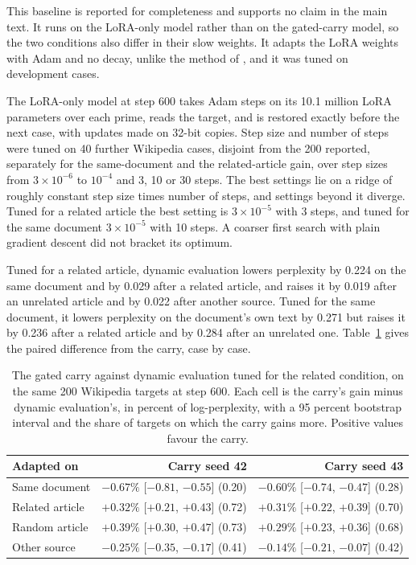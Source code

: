 \documentclass[12pt,a4paper]{report}
\begin{document}
This baseline is reported for completeness and supports no claim in the main text. It runs on the LoRA-only model rather than on the gated-carry model, so the two conditions also differ in their slow weights. It adapts the LoRA weights with Adam and no decay, unlike the method of \citet{krause2018dynamic}, and it was tuned on development cases.

The LoRA-only model at step 600 takes Adam steps on its 10.1 million LoRA parameters over each prime, reads the target, and is restored exactly before the next case, with updates made on 32-bit copies. Step size and number of steps were tuned on 40 further Wikipedia cases, disjoint from the 200 reported, separately for the same-document and the related-article gain, over step sizes from $3 \times 10^{-6}$ to $10^{-4}$ and 3, 10 or 30 steps. The best settings lie on a ridge of roughly constant step size times number of steps, and settings beyond it diverge. Tuned for a related article the best setting is $3 \times 10^{-5}$ with 3 steps, and tuned for the same document $3 \times 10^{-5}$ with 10 steps. A coarser first search with plain gradient descent did not bracket its optimum.

Tuned for a related article, dynamic evaluation lowers perplexity by 0.224 on the same document and by 0.029 after a related article, and raises it by 0.019 after an unrelated article and by 0.022 after another source. Tuned for the same document, it lowers perplexity on the document's own text by 0.271 but raises it by 0.236 after a related article and by 0.284 after an unrelated one. Table~\ref{tab-dyneval} gives the paired difference from the carry, case by case.

\begin{table}[H]
  \centering
  \caption{The gated carry against dynamic evaluation tuned for the related condition, on the same 200 Wikipedia targets at step 600. Each cell is the carry's gain minus dynamic evaluation's, in percent of log-perplexity, with a 95 percent bootstrap interval and the share of targets on which the carry gains more. Positive values favour the carry.}
  \label{tab-dyneval}
  \small
  \begin{tabular}{lrr}
    \toprule
    Adapted on & Carry seed 42 & Carry seed 43 \\
    \midrule
    Same document & $-0.67\%$ {\footnotesize [$-0.81$, $-0.55$]} (0.20) & $-0.60\%$ {\footnotesize [$-0.74$, $-0.47$]} (0.28) \\
    Related article & $+0.32\%$ {\footnotesize [$+0.21$, $+0.43$]} (0.72) & $+0.31\%$ {\footnotesize [$+0.22$, $+0.39$]} (0.70) \\
    Random article & $+0.39\%$ {\footnotesize [$+0.30$, $+0.47$]} (0.73) & $+0.29\%$ {\footnotesize [$+0.23$, $+0.36$]} (0.68) \\
    Other source & $-0.25\%$ {\footnotesize [$-0.35$, $-0.17$]} (0.41) & $-0.14\%$ {\footnotesize [$-0.21$, $-0.07$]} (0.42) \\
    \bottomrule
  \end{tabular}
\end{table}
\end{document}
